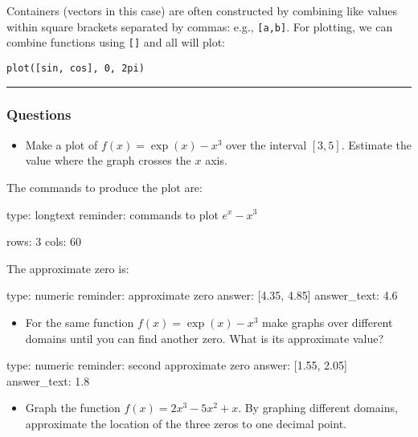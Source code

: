 \documentclass[12pt]{article}
\begin{document}
Containers (vectors in this case) are often constructed by combining
like values within square brackets separated by commas: e.g.,
\texttt{{[}a,b{]}}. For plotting, we can combine functions using
\texttt{{[}{]}} and all will plot:



\begin{verbatim}
plot([sin, cos], 0, 2pi)
\end{verbatim}
\begin{center}\rule{3in}{0.4pt}\end{center}

\subsubsection{Questions}

\begin{itemize}
\itemsep1pt\parskip0pt
\item
  Make a plot of $f(x) = \exp(x) - x^3$ over the interval $[3,5]$.
  Estimate the value where the graph crosses the $x$ axis.
\end{itemize}

The commands to produce the plot are:

\begin{answer}
type: longtext
reminder: commands to plot \( e^x - x^3 \)

rows: 3
cols: 60
\end{answer}

The approximate zero is:

\begin{answer}
    type: numeric
    reminder: approximate zero
    answer: [4.35, 4.85]
answer_text: 4.6 
\end{answer}

\begin{itemize}
\itemsep1pt\parskip0pt
\item
  For the same function $f(x) = \exp(x) - x^3$ make graphs over
  different domains until you can find another zero. What is its
  approximate value?
\end{itemize}

\begin{answer}
    type: numeric
    reminder: second approximate zero
    answer: [1.55, 2.05]
answer_text: 1.8 
\end{answer}

\begin{itemize}
\itemsep1pt\parskip0pt
\item
  Graph the function $f(x) = 2x^3 - 5x^2 + x$. By graphing different
  domains, approximate the location of the three zeros to one decimal
  point.
\end{itemize}
\end{document}
